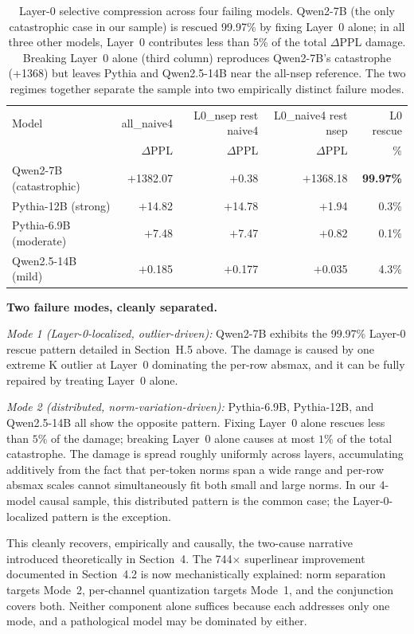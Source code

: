 \documentclass[11pt]{article}
\begin{document}
\begin{table}[h]
\centering
\small
\begin{tabular}{lrrrr}
\toprule
Model & all\_naive4 & L0\_nsep rest naive4 & L0\_naive4 rest nsep & L0 rescue \\
      & $\Delta$PPL & $\Delta$PPL & $\Delta$PPL & \% \\
\midrule
Qwen2-7B (catastrophic)         & $+$1382.07  & $+$0.38  & $+$1368.18 & \textbf{99.97\%} \\
\midrule
Pythia-12B (strong)             & $+$14.82    & $+$14.78 & $+$1.94    & 0.3\% \\
Pythia-6.9B (moderate)          & $+$7.48     & $+$7.47  & $+$0.82    & 0.1\% \\
Qwen2.5-14B (mild)              & $+$0.185    & $+$0.177 & $+$0.035   & 4.3\% \\
\bottomrule
\end{tabular}
\caption{Layer-0 selective compression across four failing models. Qwen2-7B (the only catastrophic case in our sample) is rescued 99.97\% by fixing Layer~0 alone; in all three other models, Layer~0 contributes less than 5\% of the total $\Delta$PPL damage. Breaking Layer~0 alone (third column) reproduces Qwen2-7B's catastrophe (+1368) but leaves Pythia and Qwen2.5-14B near the all-nsep reference. The two regimes together separate the sample into two empirically distinct failure modes.}
\label{tab:two_modes}
\end{table}

\textbf{Two failure modes, cleanly separated.}

\emph{Mode 1 (Layer-0-localized, outlier-driven):} Qwen2-7B exhibits the 99.97\% Layer-0 rescue pattern detailed in Section~H.5 above. The damage is caused by one extreme K outlier at Layer~0 dominating the per-row absmax, and it can be fully repaired by treating Layer~0 alone.

\emph{Mode 2 (distributed, norm-variation-driven):} Pythia-6.9B, Pythia-12B, and Qwen2.5-14B all show the opposite pattern. Fixing Layer~0 alone rescues less than $5\%$ of the damage; breaking Layer~0 alone causes at most $1\%$ of the total catastrophe. The damage is spread roughly uniformly across layers, accumulating additively from the fact that per-token norms span a wide range and per-row absmax scales cannot simultaneously fit both small and large norms. In our 4-model causal sample, this distributed pattern is the common case; the Layer-0-localized pattern is the exception.

This cleanly recovers, empirically and causally, the two-cause narrative introduced theoretically in Section~4. The 744$\times$ superlinear improvement documented in Section~4.2 is now mechanistically explained: norm separation targets Mode~2, per-channel quantization targets Mode~1, and the conjunction covers both. Neither component alone suffices because each addresses only one mode, and a pathological model may be dominated by either.
\end{document}
